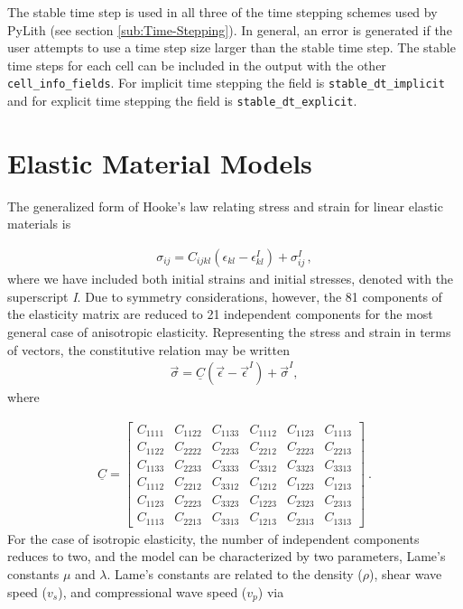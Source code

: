 The stable time step is used in all three of the time stepping schemes
used by PyLith (see section \vref{sub:Time-Stepping}). In general,
an error is generated if the user attempts to use a time step size
larger than the stable time step. The stable time steps for each cell
can be included in the output with the other \texttt{cell\_info\_fields}.
For implicit time stepping the field is \texttt{stable\_dt\_implicit}
and for explicit time stepping the field is \texttt{stable\_dt\_explicit}.


\section{Elastic Material Models}

The generalized form of Hooke's law relating stress and strain for
linear elastic materials is

\begin{gather}
\sigma_{ij}=C_{ijkl}\left(\epsilon_{kl}-\epsilon_{kl}^{I}\right)+\sigma_{ij}^{I}\,,\label{eq:1}
\end{gather}
where we have included both initial strains and initial stresses,
denoted with the superscript \textsl{I}. Due to symmetry considerations,
however, the 81 components of the elasticity matrix are reduced to
21 independent components for the most general case of anisotropic
elasticity. Representing the stress and strain in terms of vectors,
the constitutive relation may be written
\begin{gather}
\overrightarrow{\sigma}=\underline{C}\left(\vec{\epsilon}-\vec{\epsilon}^{I}\right)+\vec{\sigma}^{I},\label{eq:2}
\end{gather}
where

\begin{gather}
\underline{C}=\left[\begin{array}{cccccc}
C_{1111} & C_{1122} & C_{1133} & C_{1112} & C_{1123} & C_{1113}\\
C_{1122} & C_{2222} & C_{2233} & C_{2212} & C_{2223} & C_{2213}\\
C_{1133} & C_{2233} & C_{3333} & C_{3312} & C_{3323} & C_{3313}\\
C_{1112} & C_{2212} & C_{3312} & C_{1212} & C_{1223} & C_{1213}\\
C_{1123} & C_{2223} & C_{3323} & C_{1223} & C_{2323} & C_{2313}\\
C_{1113} & C_{2213} & C_{3313} & C_{1213} & C_{2313} & C_{1313}
\end{array}\right]\:.\label{eq:3}
\end{gather}
For the case of isotropic elasticity, the number of independent components
reduces to two, and the model can be characterized by two parameters,
Lame's constants $\mu$ and $\lambda$. Lame's constants are related
to the density ($\rho$), shear wave speed ($v_{s}$), and compressional
wave speed ($v_{p}$) via

